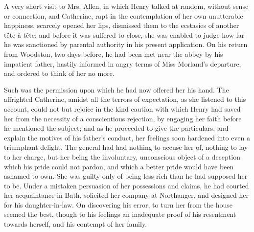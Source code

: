 A very short visit to Mrs. Allen, in which Henry talked at random, without sense or connection, and Catherine, rapt in the contemplation of her own unutterable happiness, scarcely opened her lips, dismissed them to the ecstasies of another tête-à-tête; and before it was suffered to close, she was enabled to judge how far he was sanctioned by parental authority in his present application. On his return from Woodston, two days before, he had been met near the abbey by his impatient father, hastily informed in angry terms of Miss Morland's departure, and ordered to think of her no more.

Such was the permission upon which he had now offered her his hand. The affrighted Catherine, amidst all the terrors of expectation, as she listened to this account, could not but rejoice in the kind caution with which Henry had saved her from the necessity of a conscientious rejection, by engaging her faith before he mentioned the subject; and as he proceeded to give the particulars, and explain the motives of his father's conduct, her feelings soon hardened into even a triumphant delight. The general had had nothing to accuse her of, nothing to lay to her charge, but her being the involuntary, unconscious object of a deception which his pride could not pardon, and which a better pride would have been ashamed to own. She was guilty only of being less rich than he had supposed her to be. Under a mistaken persuasion of her possessions and claims, he had courted her acquaintance in Bath, solicited her company at Northanger, and designed her for his daughter-in-law. On discovering his error, to turn her from the house seemed the best, though to his feelings an inadequate proof of his resentment towards herself, and his contempt of her family.

